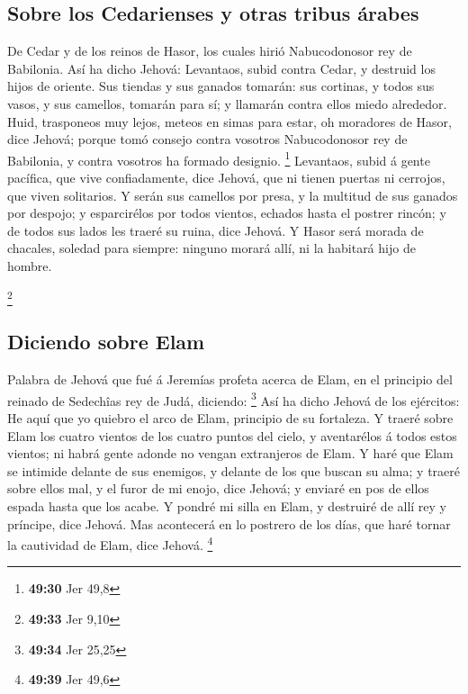 \hypertarget{sobre-los-cedarienses-y-otras-tribus-uxe1rabes}{%
\subsection{Sobre los Cedarienses y otras tribus
árabes}\label{sobre-los-cedarienses-y-otras-tribus-uxe1rabes}}

 De Cedar y de los reinos de Hasor, los cuales hirió
Nabucodonosor rey de Babilonia. Así ha dicho Jehová: Levantaos, subid
contra Cedar, y destruid los hijos de oriente.  Sus
tiendas y sus ganados tomarán: sus cortinas, y todos sus vasos, y sus
camellos, tomarán para sí; y llamarán contra ellos miedo alrededor.
 Huid, trasponeos muy lejos, meteos en simas para estar,
oh moradores de Hasor, dice Jehová; porque tomó consejo contra vosotros
Nabucodonosor rey de Babilonia, y contra vosotros ha formado designio.
\footnote{\textbf{49:30} Jer 49,8}  Levantaos, subid á
gente pacífica, que vive confiadamente, dice Jehová, que ni tienen
puertas ni cerrojos, que viven solitarios.  Y serán sus
camellos por presa, y la multitud de sus ganados por despojo; y
esparcirélos por todos vientos, echados hasta el postrer rincón; y de
todos sus lados les traeré su ruina, dice Jehová.  Y
Hasor será morada de chacales, soledad para siempre: ninguno morará
allí, ni la habitará hijo de hombre.

\footnote{\textbf{49:33} Jer 9,10}

\hypertarget{diciendo-sobre-elam}{%
\subsection{Diciendo sobre Elam}\label{diciendo-sobre-elam}}

 Palabra de Jehová que fué á Jeremías profeta acerca de
Elam, en el principio del reinado de Sedechîas rey de Judá, diciendo:
\footnote{\textbf{49:34} Jer 25,25}  Así ha dicho Jehová
de los ejércitos: He aquí que yo quiebro el arco de Elam, principio de
su fortaleza.  Y traeré sobre Elam los cuatro vientos de
los cuatro puntos del cielo, y aventarélos á todos estos vientos; ni
habrá gente adonde no vengan extranjeros de Elam.  Y haré
que Elam se intimide delante de sus enemigos, y delante de los que
buscan su alma; y traeré sobre ellos mal, y el furor de mi enojo, dice
Jehová; y enviaré en pos de ellos espada hasta que los acabe.
 Y pondré mi silla en Elam, y destruiré de allí rey y
príncipe, dice Jehová.  Mas acontecerá en lo postrero de
los días, que haré tornar la cautividad de Elam, dice Jehová.
\footnote{\textbf{49:39} Jer 49,6}

